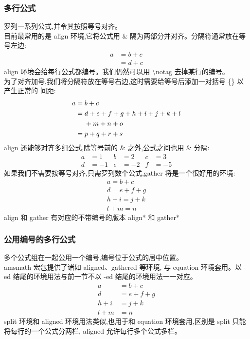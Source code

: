 \documentclass[a4paper]{ctexart}
\begin{document}
    \subsubsection{多行公式}
    罗列一系列公式,并令其按照等号对齐。\\
    目前最常用的是 align 环境,它将公式用 \& 隔为两部分并对齐。分隔符通常放在等号左边:
    \begin{align}
        a & = b + c \\
          & = d + c
    \end{align}
    align 环境会给每行公式都编号。我们仍然可以用 \textbackslash notag 去掉某行的编号。\\
    为了对齐加号,我们将分隔符放在等号右边,这时需要给等号后添加一对括号 \{\} 以产生正常的 间距:
    \begin{align}
        a ={} & b + c   \\
          ={} & d + e + f + g + h + i + j + k + l \notag    \\
              & + m + n + o \\
          ={} & p + q + r + s   
    \end{align}
    align 还能够对齐多组公式,除等号前的 \& 之外,公式之间也用 \& 分隔:
    \begin{align}
        a & = 1     & b & = 2   & c & = 3   \\
        d & = - 1   & e & = - 2 & f & = - 5 
    \end{align}
    如果我们不需要按等号对齐,只需罗列数个公式,gather 将是一个很好用的环境:
    \begin{gather}
        a = b + c   \\
        d = e + f + g   \\
        h + i = j + k   \\
        l + m = n
    \end{gather}
    align 和 gather 有对应的不带编号的版本 align* 和 gather*
    \subsubsection{公用编号的多行公式}
    多个公式组在一起公用一个编号,编号位于公式的居中位置。\\
    amsmath 宏包提供了诸如 aligned、gathered 等环境,%
    与 equation 环境套用。以 -ed 结尾的环境用法与前一节不以 -ed 结尾的环境用法一一对应。
    \begin{equation}
        \begin{aligned}
            a & = b + c \\
            d & = e + f + g   \\
            h + i & = j + k   \\
            l + m & = n
        \end{aligned}
    \end{equation}
    split 环境和 aligned 环境用法类似,也用于和 equation 环境套用,区别是 split 只能 将每行的一个公式分两栏,
    aligned 允许每行多个公式多栏。
\end{document}
